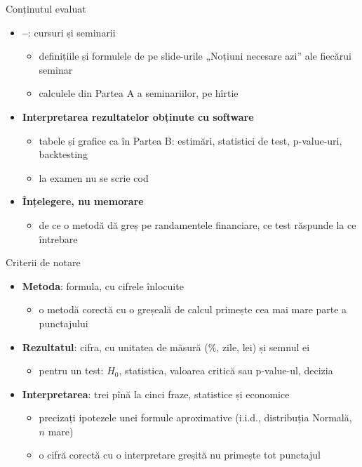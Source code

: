 \begin{frame}{Conținutul evaluat}
\itemsize{\small}
\begin{itemize}
    \item \textbf{--}: cursuri și seminarii
    \begin{itemize}
        \item definițiile și formulele de pe slide-urile „Noțiuni necesare azi” ale fiecărui seminar
        \item calculele din Partea A a seminariilor, pe hîrtie
    \end{itemize}
    \item \textbf{Interpretarea rezultatelor obținute cu software}
    \begin{itemize}
        \item tabele și grafice ca în Partea B: estimări, statistici de test, p-value-uri, backtesting
        \item la examen nu se scrie cod
    \end{itemize}
    \item \textbf{Înțelegere, nu memorare}
    \begin{itemize}
        \item de ce o metodă dă greș pe randamentele financiare, ce test răspunde la ce întrebare
    \end{itemize}
\end{itemize}
\end{frame}

\begin{frame}{Criterii de notare}
\itemsize{\small}
\begin{itemize}
    \item \textbf{Metoda}: formula, cu cifrele înlocuite
    \begin{itemize}
        \item o metodă corectă cu o greșeală de calcul primește cea mai mare parte a punctajului
    \end{itemize}
    \item \textbf{Rezultatul}: cifra, cu unitatea de măsură (\%, zile, lei) și semnul ei
    \begin{itemize}
        \item pentru un test: $H_0$, statistica, valoarea critică sau p-value-ul, decizia
    \end{itemize}
    \item \textbf{Interpretarea}: trei pînă la cinci fraze, statistice și economice
    \begin{itemize}
        \item precizați ipotezele unei formule aproximative (i.i.d., distribuția Normală, $n$ mare)
        \item o cifră corectă cu o interpretare greșită nu primește tot punctajul
    \end{itemize}
\end{itemize}
\end{frame}

